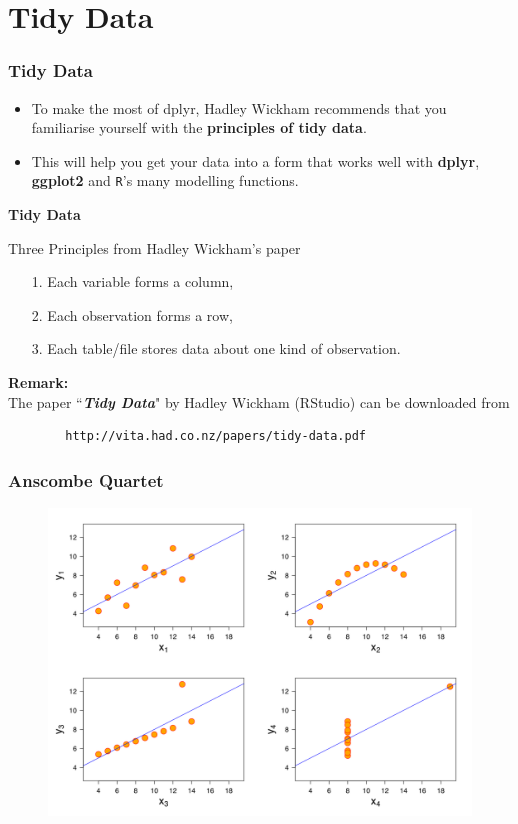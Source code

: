 \documentclass{beamer}
\begin{document}
\section{Tidy Data}
\begin{frame}
		\frametitle{Tidy Data}
		\Large
		\vspace{-1cm}
		\begin{itemize}
			\item To make the most of dplyr, Hadley Wickham recommends that you familiarise yourself with the \textbf{principles of tidy data}. 
			\item This will help you get your data into a form that works well with \textbf{dplyr}, \textbf{ggplot2} and \texttt{R}'s many modelling functions.
		\end{itemize}
\end{frame}
\begin{frame}[fragile]
\large
\textbf{Tidy Data}
\begin{framed}
\noindent Three Principles from Hadley Wickham's paper
			\begin{itemize}
				\item[1.] Each variable forms a column, 
				\item[2.] Each observation forms a row, 
				\item[3.] Each table/file stores data about one kind of observation.
			\end{itemize}
		\end{framed}
		\noindent \textbf{Remark:} \\  The paper ``\textit{\textbf{Tidy Data}}" by Hadley Wickham (RStudio) can be downloaded from 
		\begin{verbatim}
		http://vita.had.co.nz/papers/tidy-data.pdf
		\end{verbatim}
\end{frame}

\begin{frame}
\frametitle{Anscombe Quartet}
	\begin{figure}
\centering
\includegraphics[width=0.9\linewidth]{images/AnscombeQuartet}

\end{figure}

\end{frame}
\end{document}
